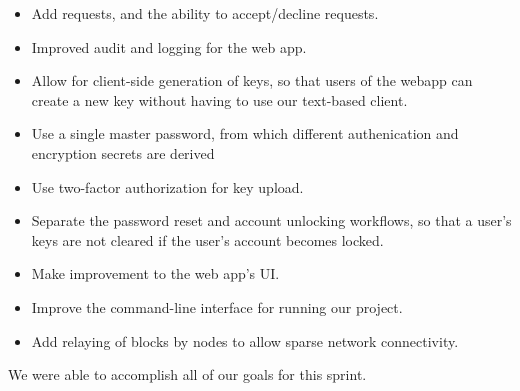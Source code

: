 \documentclass[a4paper,12pt]{article}
\begin{document}
\begin{itemize}
\item Add requests, and the ability to accept/decline requests.
\item Improved audit and logging for the web app.
\item Allow for client-side generation of keys, so that users of the webapp can create a new key without having to use our text-based client.
\item Use a single master password, from which different authenication and encryption secrets are derived
\item Use two-factor authorization for key upload.
\item Separate the password reset and account unlocking workflows, so that a user's keys are not cleared if the user's account becomes locked.
\item Make improvement to the web app's UI.
\item Improve the command-line interface for running our project.
\item Add relaying of blocks by nodes to allow sparse network connectivity.
\end{itemize}

\bigskip\noindent We were able to accomplish all of our goals for this sprint.
\end{document}
